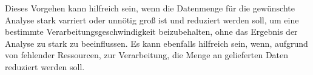 Dieses Vorgehen kann hilfreich sein, 
wenn die Datenmenge für die gewünschte Analyse stark varriert oder unnötig groß ist und reduziert werden soll, 
um eine bestimmte Verarbeitungsgeschwindigkeit beizubehalten, 
ohne das Ergebnis der Analyse zu stark zu beeinflussen.
Es kann ebenfalls hilfreich sein, 
wenn, aufgrund von fehlender Ressourcen, zur Verarbeitung, die Menge an gelieferten Daten reduziert werden soll.

